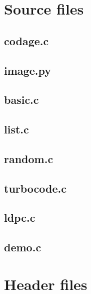 \documentclass{article}
\author{Tom Hubrecht}
\begin{document}
\tableofcontents
\newpage


\section{Source files}


\subsection{codage.c}


\subsection{image.py}

\newpage

\subsection{basic.c}

\newpage

\subsection{list.c}

\newpage

\subsection{random.c}

\newpage

\subsection{turbocode.c}

\newpage

\subsection{ldpc.c}

\newpage

\subsection{demo.c}

\newpage


\section{Header files}
\end{document}
